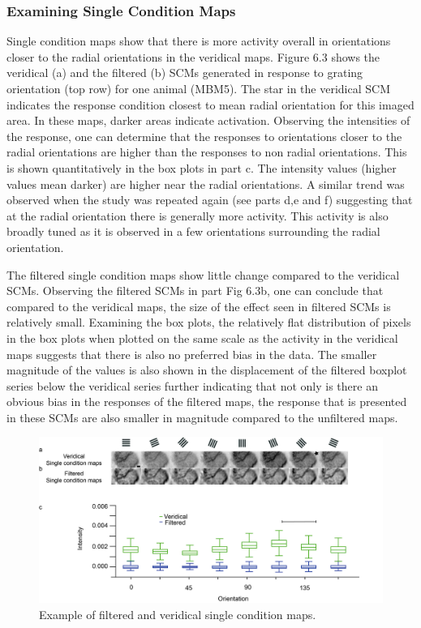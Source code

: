 		\subsubsection{Examining Single Condition Maps}
			Single condition maps show that there is more activity overall in orientations closer to the radial orientations in the veridical maps. Figure 6.3 shows the veridical (a) and the filtered (b) SCMs generated in response to grating orientation (top row) for one animal (MBM5). The star in the veridical SCM indicates the response condition closest to mean radial orientation for this imaged area.  In these maps, darker areas indicate activation. Observing the intensities of the response, one can determine that the responses to orientations closer to the radial orientations are higher than the responses to non radial orientations. This is shown quantitatively in the box plots in part c. The intensity values (higher values mean darker) are higher near the radial orientations. A similar trend was observed when the study was repeated again (see parts d,e and f) suggesting that at the radial orientation there is generally more activity. This activity is also broadly tuned as it is observed in a few orientations surrounding the radial orientation.
						
			The filtered single condition maps show little change compared to the veridical SCMs. Observing the filtered SCMs in part Fig 6.3b, one can conclude that compared to the veridical maps, the size of the effect seen in filtered SCMs is relatively small. Examining the box plots, the relatively flat distribution of pixels in the box plots when plotted on the same scale as the activity in the veridical maps suggests that there is also no preferred bias in the data. The smaller magnitude of the values is also shown in the displacement of the filtered boxplot series below the veridical series further indicating that not only is there an obvious bias in the responses of the filtered maps, the response that is presented in these SCMs are also smaller in magnitude compared to the unfiltered maps.
			
						\begin{figure}
							
							\includegraphics[width=\linewidth]{rb/scms.jpg}
							\caption{Example of filtered and veridical single condition maps.}
							\label{fig:fig3}
						\end{figure}
